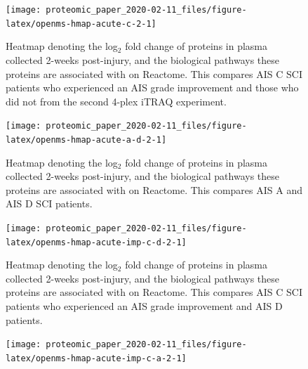 \documentclass[9pt,lineno]{elife}
\newcommand{\blandscape}{\begin{landscape}}
\newcommand{\elandscape}{\end{landscape}}
\begin{document}
\begin{landscape}
\begin{landscape}
\begin{landscape}
\begin{figure}
{\centering \texttt{[image: proteomic\_paper\_2020-02-11\_files/figure-latex/openms-hmap-acute-c-2-1]} 

}

\caption[Heatmap - iTRAQ - Acute C Improvers VS Subacute Improvers]{Heatmap denoting the log\(_2\) fold change of proteins in plasma collected 2-weeks post-injury, and the biological pathways these proteins are associated with on Reactome. This compares AIS C SCI patients who experienced an AIS grade improvement and those who did not from the second 4-plex iTRAQ experiment.}\label{fig:openms-hmap-acute-c-2}
\end{figure}

\elandscape
\blandscape



\begin{figure}

{\centering \texttt{[image: proteomic\_paper\_2020-02-11\_files/figure-latex/openms-hmap-acute-a-d-2-1]} 

}

\caption[Heatmap - iTRAQ - Acute A VS Acute D]{Heatmap denoting the log\(_2\) fold change of proteins in plasma collected 2-weeks post-injury, and the biological pathways these proteins are associated with on Reactome. This compares AIS A and AIS D SCI patients.}\label{fig:openms-hmap-acute-a-d-2}
\end{figure}

\elandscape
\blandscape



\begin{figure}

{\centering \texttt{[image: proteomic\_paper\_2020-02-11\_files/figure-latex/openms-hmap-acute-imp-c-d-2-1]} 

}

\caption[Heatmap - iTRAQ - Acute C Improvers VS Acute D]{Heatmap denoting the log\(_2\) fold change of proteins in plasma collected 2-weeks post-injury, and the biological pathways these proteins are associated with on Reactome. This compares AIS C SCI patients who experienced an AIS grade improvement and AIS D patients.}\label{fig:openms-hmap-acute-imp-c-d-2}
\end{figure}

\elandscape
\blandscape



\begin{figure}

{\centering \texttt{[image: proteomic\_paper\_2020-02-11\_files/figure-latex/openms-hmap-acute-imp-c-a-2-1]} 

}
\end{figure}
\end{landscape}
\end{landscape}
\end{landscape}
\end{document}
